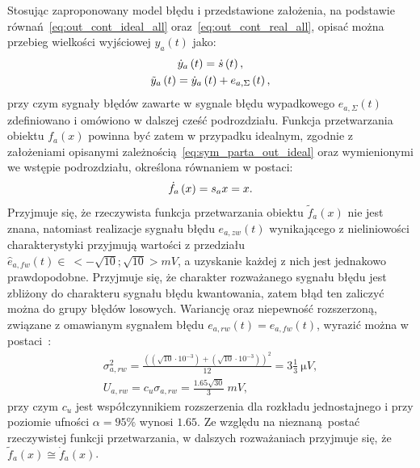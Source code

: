 Stosując zaproponowany model błędu i przedstawione założenia, na podstawie równań~\eqref{eq:out_cont_ideal_all} oraz~\eqref{eq:out_cont_real_all}, opisać można przebieg wielkości wyjściowej $y_{a}(t)$ jako:
\begin{gather}
\dot{y}_{a} \left(t\right) = \dot{s} \left(t\right) \label{eq:sym_parta_out_ideal}, \\
\tilde{y}_{a} \left(t\right) = \dot{y}_{a} \left(t\right) + e_{a,\Sigma} \left(t\right) \label{eq:sym_parta_out_real},
\end{gather}
przy czym sygnały błędów zawarte w sygnale błędu wypadkowego $e_{a,\Sigma}(t)$ zdefiniowano i omówiono w dalszej cześć podrozdziału. Funkcja przetwarzania obiektu $f_{a}(x)$ powinna być zatem w przypadku idealnym, zgodnie z założeniami opisanymi zależnością~\eqref{eq:sym_parta_out_ideal} oraz wymienionymi we wstępie podrozdziału, określona równaniem w postaci:
\begin{equation}
\dot{f}_{a} \left(x\right) = s_{a} x = x \label{eq:sym_parta_statfun}.
\end{equation}
Przyjmuje się, że rzeczywista funkcja przetwarzania obiektu $\tilde{f}_{a}(x)$ nie jest znana, natomiast realizacje sygnału błędu $e_{a,zw}(t)$ wynikającego z nieliniowości charakterystyki przyjmują wartości z przedziału $\hat{e}_{a,fw}(t) \in~<-\sqrt{10};\sqrt{10}>\unit{mV}$, a uzyskanie każdej z nich jest jednakowo prawdopodobne. Przyjmuje się, że charakter rozważanego sygnału błędu jest zbliżony do charakteru sygnału błędu kwantowania, zatem błąd ten zaliczyć można do grupy błędów losowych. Wariancję oraz niepewność rozszerzoną, związane z omawianym sygnałem błędu $e_{a,rw}(t) = e_{a,fw}(t)$, wyrazić można w postaci~\cite{jcgm_guide}:
\begin{gather}
\sigma_{a,rw}^{2} = \frac{\left( \left( \sqrt{10} \cdot 10^{-3} \right) + \left( \sqrt{10} \cdot 10^{-3} \right) \right)^{2}}{12} = 3 \frac{1}{3}~\unit{\micro V} \label{eq:sym_parta_rand_self_var}, \\
U_{a,rw} = c_{u} \sigma_{a,rw} = \frac{1.65 \sqrt{30}}{3}~\unit{mV} \label{eq:sym_parta_rand_self_unc},
\end{gather}
przy czym $c_{u}$ jest współczynnikiem rozszerzenia dla rozkładu jednostajnego i przy poziomie ufności $\alpha = 95\%$ wynosi $1.65$. Ze względu na nieznaną postać rzeczywistej funkcji przetwarzania, w dalszych rozważaniach przyjmuje się, że $\tilde{f}_{a}(x)  \cong  \dot{f}_{a}(x)$.

